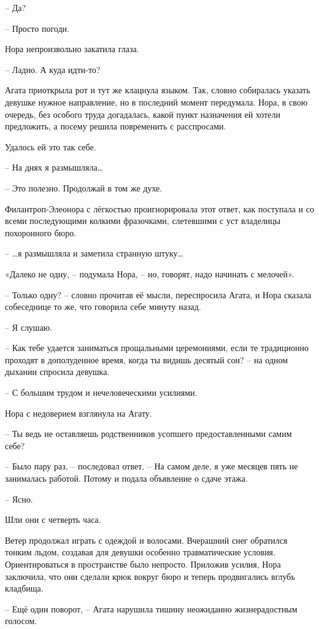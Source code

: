 \documentclass[
  a5paperpaper,
  DIV=11,
  numbers=noendperiod]{scrreprt}
\begin{document}
-- Да?

-- Просто погоди.

Нора непроизвольно закатила глаза.

-- Ладно. А куда идти-то?

Агата приоткрыла рот и тут же клацнула языком. Так, словно собиралась
указать девушке нужное направление, но в последний момент передумала.
Нора, в свою очередь, без особого труда догадалась, какой пункт
назначения ей хотели предложить, а посему решила повременить с
расспросами.

Удалось ей это так себе.

-- На днях я размышляла\ldots{}

-- Это полезно. Продолжай в том же духе.

Филантроп-Элеонора с лёгкостью проигнорировала этот ответ, как поступала
и со всеми последующими колкими фразочками, слетевшими с уст владелицы
похоронного бюро.

-- \ldots я размышляла и заметила странную штуку\ldots{}

«Далеко не одну, -- подумала Нора, -- но, говорят, надо начинать с
мелочей».

-- Только одну? -- словно прочитав её мысли, переспросила Агата, и Нора
сказала собеседнице то же, что говорила себе минуту назад.

-- Я слушаю.

-- Как тебе удается заниматься прощальными церемониями, если те
традиционно проходят в дополуденное время, когда ты видишь десятый сон?
-- на одном дыхании спросила девушка.

-- С большим трудом и нечеловеческими усилиями.

Нора с недоверием взглянула на Агату.

-- Ты ведь не оставляешь родственников усопшего предоставленными самим
себе?

-- Было пару раз, -- последовал ответ. -- На самом деле, я уже месяцев
пять не занималась работой. Потому и подала объявление о сдаче этажа.

-- Ясно.

Шли они с четверть часа.

Ветер продолжал играть с одеждой и волосами. Вчерашний снег обратился
тонким льдом, создавая для девушки особенно травматические условия.
Ориентироваться в пространстве было непросто. Приложив усилия, Нора
заключила, что они сделали крюк вокруг бюро и теперь продвигались вглубь
кладбища.

-- Ещё один поворот, -- Агата нарушила тишину неожиданно жизнерадостным
голосом.
\end{document}
